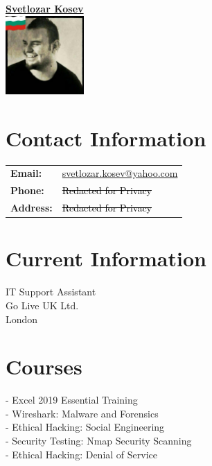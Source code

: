 \documentclass[letterpaper,10pt]{article}
\begin{document}
	
	\pagestyle{empty} %
	
	
	
	\begin{minipage}[t]{0.5\textwidth}
		\begin{center}
			\Large\textbf{\href{https://www.linkedin.com/in/svetlozar-kosev-m-sc-it-278058144/}{Svetlozar Kosev}}\\[2ex]
			\includegraphics[width=3cm,height=3cm]{your_photo.jpg}
		\end{center}
		
		\section*{Contact Information}
		\begin{tabular}{@{}l l}
			\textbf{Email:} & \href{mailto:svetlozar.kosev@}{svetlozar.kosev@yahoo.com} \\
			\textbf{Phone:} & \textcolor{black}{\st{Redacted for Privacy}} \\
			\textbf{Address:} & \textcolor{black}{\st{Redacted for Privacy}} \\
		\end{tabular}
		
		\section*{Current Information}
		IT Support Assistant \\
		Go Live UK Ltd. \\
		London \\
		
		\section*{Courses}
		
		- Excel 2019 Essential Training\\
		- Wireshark: Malware and Forensics\\
		- Ethical Hacking: Social Engineering\\
		- Security Testing: Nmap Security Scanning\\
		- Ethical Hacking: Denial of Service
		

\end{minipage}
\end{document}
